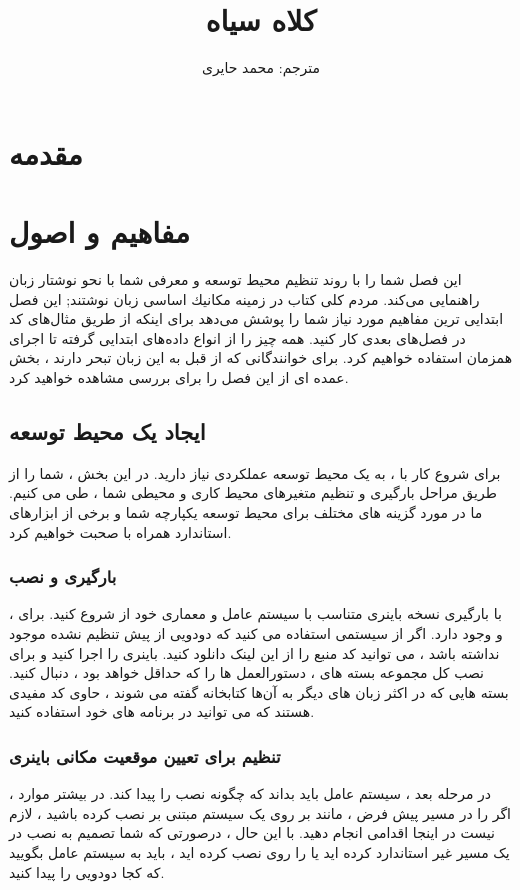 \documentclass[12pt]{book}
\title{\lr{Go} کلاه سیاه}
\author{مترجم: محمد حایری}
\begin{document}
\maketitle
\tableofcontents
\setcounter{chapter}{-1}
\chapter{مقدمه}
\chapter{مفاهیم و اصول }
این فصل شما را با روند تنظیم محیط توسعه  و معرفی شما با نحو نوشتار زبان راهنمایی می‌کند.
مردم كلی كتاب در زمینه مکانیك اساسی زبان نوشتند;
این فصل ابتدایی ترین مفاهیم مورد نیاز شما را پوشش می‌دهد برای اینکه از طریق مثال‌های کد در فصل‌های بعدی کار کنید.
همه چیز را از انواع داده‌های ابتدایی گرفته تا اجرای همزمان استفاده خواهیم کرد.
برای خوانندگانی که از قبل به این زبان تبحر دارند ، بخش عمده ای از این فصل را برای بررسی مشاهده خواهید کرد.
\section{ایجاد یک محیط توسعه}
برای شروع کار با  ، به یک محیط توسعه عملکردی نیاز دارید.
در این بخش ، شما را از طریق مراحل بارگیری و تنظیم متغیرهای محیط کاری و محیطی شما ، طی می کنیم.
ما در مورد گزینه های مختلف برای محیط توسعه یکپارچه شما و برخی از ابزارهای استاندارد همراه با  صحبت خواهیم کرد.
\subsection{بارگیری و نصب }
با بارگیری نسخه باینری  متناسب با سیستم عامل و معماری خود از  شروع کنید.
 برای  ،  و  وجود دارد.
اگر از سیستمی استفاده می کنید که دودویی از پیش تنظیم نشده موجود نداشته باشد ، می توانید کد منبع را از این لینک دانلود کنید.
باینری را اجرا کنید و برای نصب کل مجموعه بسته های  ، دستورالعمل ها را که حداقل خواهد بود ، دنبال کنید.
بسته هایی که در اکثر زبان های دیگر به آن‌ها کتابخانه گفته می شوند ، حاوی کد مفیدی هستند که می توانید در برنامه های خود استفاده کنید.
\subsection{تنظیم  برای تعیین موقعیت مکانی باینری}
در مرحله بعد ، سیستم عامل باید بداند که چگونه نصب  را پیدا کند.
در بیشتر موارد ، اگر  را در مسیر پیش فرض ، مانند  بر روی یک سیستم مبتنی بر  نصب کرده باشید ، لازم نیست در اینجا اقدامی انجام دهید.
با این حال ، درصورتی که شما تصمیم به نصب  در یک مسیر غیر استاندارد کرده اید یا  را روی  نصب کرده اید ، باید به سیستم عامل بگویید که کجا دودویی  را پیدا کنید.
\end{document}
